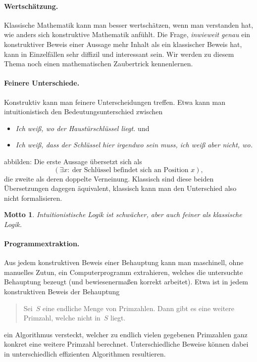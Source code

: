 \documentclass[a4paper,ngerman,12pt]{scrartcl}
\theoremstyle{definition}
\theoremstyle{plain}
\newtheorem{motto}[defn]{Motto}
\theoremstyle{remark}
\renewcommand{\_}{\mathpunct{.}\,}
\newcommand{\?}{\,{:}\,}
\begin{document}
\paragraph{Wertschätzung.} Klassische Mathematik kann man besser wertschätzen,
wenn man verstanden hat, wie anders sich konstruktive Mathematik anfühlt.
Die Frage, \emph{inwieweit genau} ein konstruktiver Beweis einer Aussage mehr
Inhalt als ein klassischer Beweis hat, kann in Einzelfällen sehr diffizil und
interessant sein. Wir werden zu diesem Thema noch einen mathematischen
Zaubertrick kennenlernen.

\paragraph{Feinere Unterschiede.} Konstruktiv kann man feinere Unterscheidungen
treffen. Etwa kann man intuitionistisch den Bedeutungsunterschied zwischen
\begin{itemize}
\item \emph{Ich weiß, wo der Haustürschlüssel liegt.} und
\item \emph{Ich weiß, dass der Schlüssel hier irgendwo sein muss, ich weiß aber
nicht, wo.}
\end{itemize}
abbilden: Die erste Aussage übersetzt sich als
\[ (\exists x{:}\ \text{der Schlüssel befindet sich an Position~$x$}), \]
die zweite als deren doppelte Verneinung. Klassisch sind diese beiden
Übersetzungen dagegen äquivalent, klassisch kann man den Unterschied also nicht
formalisieren.

\begin{motto}Intuitionistische Logik ist schwächer, aber auch feiner als
klassische Logik.\end{motto}


\paragraph{Programmextraktion.} Aus jedem konstruktiven Beweis einer Behauptung
kann man maschinell, ohne manuelles Zutun, ein Computerprogramm extrahieren,
welches die untersuchte Behauptung bezeugt (und bewiesenermaßen korrekt
arbeitet). Etwa ist in jedem konstruktiven Beweis der Behauptung
\begin{quote}Sei~$S$ eine endliche Menge von Primzahlen. Dann gibt es eine
weitere Primzahl, welche nicht in~$S$ liegt.\end{quote}
ein Algorithmus versteckt, welcher zu endlich vielen gegebenen Primzahlen
ganz konkret eine weitere Primzahl berechnet. Unterschiedliche Beweise können
dabei in unterschiedlich effizienten Algorithmen resultieren.
\end{document}
